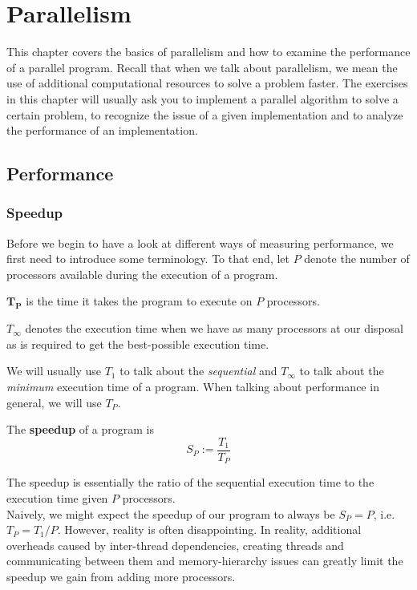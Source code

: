 \documentclass[main.tex]{subfiles}
\begin{document}
\addtolength{\tabcolsep}{-2pt}

\section{Parallelism}
This chapter covers the basics of parallelism and how to examine the performance of a parallel program. Recall that when we talk about parallelism, we mean the use of additional computational resources to solve a problem faster. The exercises in this chapter will usually ask you to implement a parallel algorithm to solve a certain problem, to recognize the issue of a given implementation and to analyze the performance of an implementation. 
\subsection{Performance}
\subsubsection{Speedup}
Before we begin to have a look at different ways of measuring performance, we first need to introduce some terminology. To that end, let $P$ denote the number of processors available during the execution of a program.
\begin{definition} 
$\mathbf{T_P}$ is the time it takes the program to execute on $P$ processors.
\begin{remark}
$T_\infty$ denotes the execution time when we have as many processors at our disposal as is required to get the best-possible execution time.
\end{remark}
\end{definition}
We will usually use $T_1$ to talk about the \textit{sequential} and $T_\infty$ to talk about the \textit{minimum} execution time of a program. When talking about performance in general, we will use $T_P$.
\begin{definition}
The \textbf{speedup} of a program is
\begin{equation*}
    S_P := \frac{T_1}{T_P}
\end{equation*}
\end{definition}
The speedup is essentially the ratio of the sequential execution time to the execution time given $P$ processors.\\
Naively, we might expect the speedup of our program to always be $S_P = P$, i.e. $T_P = T_1 / P$. However, reality is often disappointing. In reality, additional overheads caused by inter-thread dependencies, creating threads and communicating between them and memory-hierarchy issues can greatly limit the speedup we gain from adding more processors.
\end{document}
